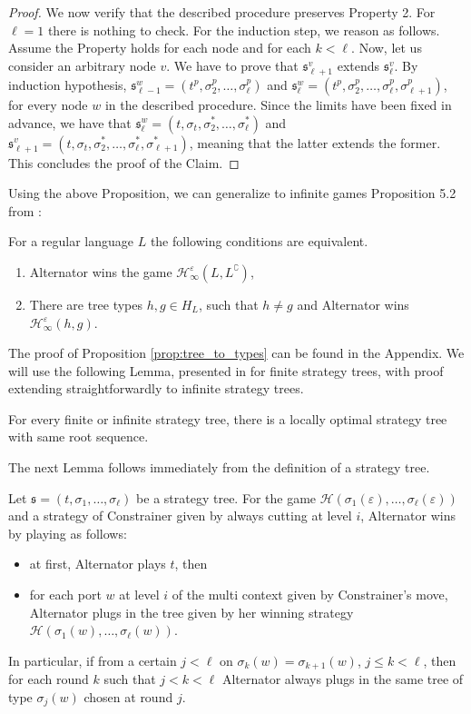 \begin{proof}
We now verify that the described procedure preserves Property 2. For $\ell=1$ there is nothing to check. For the induction step, we reason as follows. Assume the Property holds for each node and for each $k<\ell$. Now, let us consider an arbitrary node $v$. We have to prove that $\mathfrak{s}^v_{\ell+1}$ extends $\mathfrak{s}^v_{\ell}$. 
By induction hypothesis,  $\mathfrak{s}^w_{\ell-1}=(t^p, \sigma^p_{2}, \dots, \sigma^p_{\ell})$ and
$\mathfrak{s}^w_{\ell}=(t^p, \sigma^p_{2}, \dots, \sigma^p_{\ell}, \sigma^p_{\ell+1})$, for every node $w$  in the described procedure. Since the limits have been fixed in advance, we have that $\mathfrak{s}^w_{\ell}=(t, \sigma_t, \sigma^*_2, \dots, \sigma^*_\ell)$ and $\mathfrak{s}^v_{\ell+1}=(t, \sigma_t, \sigma^*_2, \dots, \sigma^*_\ell, \sigma^*_{\ell+1})$, meaning that the latter extends the former. This concludes the proof of the Claim.
 \end{proof}
 
Using the above Proposition, we can generalize to infinite games Proposition 5.2 from \cite{bp}:
\begin{proposition}\label{prop:tree_to_types}
For a regular language $L$ 
the following conditions are equivalent.
 \begin{enumerate}
\item Alternator wins the game $\mathcal{H}^\varepsilon_\infty(L, L^\complement)$, 
 \item  There are tree types $h, g\in H_L$, such that $h\neq g$ and Alternator wins $\mathcal{H}^\varepsilon_\infty(h, g)$.
 \end{enumerate}
\end{proposition}
The proof of Proposition \ref{prop:tree_to_types} can be found in the Appendix.
We will use the following Lemma, presented in \cite{bp} for finite strategy trees, with proof extending straightforwardly to infinite strategy trees.
\begin{lemma}\label{lemma:locallyoptimal}
For every finite or infinite strategy tree, there is a locally optimal strategy tree with same root sequence.
\end{lemma}
The next Lemma  follows immediately from the definition of a strategy tree.
\begin{lemma}\label{lemma:short_strategy}
Let $\mathfrak{s}=(t, \sigma_1, \dots, \sigma_\ell)$ be a strategy tree. For the game $\mathcal{H}(\sigma_1(\varepsilon), \dots, \sigma_\ell(\varepsilon))$ and a strategy of Constrainer given by always cutting at level $i$, Alternator wins  by playing as follows:
\begin{itemize}
\item at first, Alternator plays $t$, then
\item for each port $w$ at level $i$ of the multi context given by Constrainer's move, Alternator plugs in the tree given by her winning strategy $\mathcal{H}(\sigma_1(w), \dots, \sigma_\ell(w))$.
\end{itemize}
In particular, if from a certain $j<\ell$ on $\sigma_k(w)=\sigma_{k+1}(w)$, $j\leq k < \ell$, then for each round $k$ such that $j< k < \ell$ Alternator always plugs in the same tree of type $\sigma_j(w)$ chosen at round $j$.
\end{lemma}
